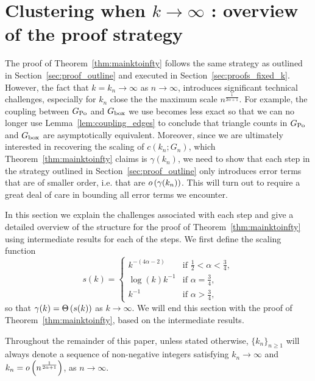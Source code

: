 
\section{Clustering when \texorpdfstring{$k\to\infty$}{k tends to infinity} : overview of the proof strategy}

The proof of Theorem~\ref{thm:mainktoinfty} follows the same strategy as outlined in Section~\ref{sec:proof_outline} and executed in Section~\ref{sec:proofs_fixed_k}. However, the fact that $k = k_n \to \infty$ as $n \to \infty$, introduces significant technical challenges, especially for $k_n$ close the the maximum scale $n^{\frac{1}{2\alpha + 1}}$. For example, the coupling between $G_{{\mathrm{Po}}}$ and $G_{\mathrm{box}}$ we use becomes less exact so that we can no longer use Lemma~\ref{lem:coupling_edges} to conclude that triangle counts in $G_{{\mathrm{Po}}}$ and $G_{\mathrm{box}}$ are asymptotically equivalent. Moreover, since we are ultimately interested in recovering the scaling of $c(k_n;G_n)$, which Theorem~\ref{thm:mainktoinfty} claims is $\gamma(k_n)$, we need to show that each step in the strategy outlined in Section~\ref{sec:proof_outline} only introduces error terms that are of smaller order, i.e. that are $o\left(\gamma(k_n)\right)$. This will turn out to require a great deal of care in bounding all error terms we encounter.

In this section we explain the challenges associated with each step and give a detailed overview of the structure for the proof of Theorem~\ref{thm:mainktoinfty} using intermediate results for each of the steps. We first define the scaling function
\begin{equation}\label{eq:def_scaling_function}
	s(k) = \begin{cases}
		k^{-(4\alpha - 2)} &\mbox{if } \frac{1}{2} < \alpha < \frac{3}{4},\\
		\log(k) k^{-1} &\mbox{if } \alpha = \frac{3}{4},\\
		k^{-1} &\mbox{if } \alpha > \frac{3}{4},
	\end{cases}
\end{equation}
so that $\gamma(k) = \Theta\left(s(k)\right)$ as $k \to \infty$. We will end this section with the proof of Theorem~\ref{thm:mainktoinfty}, based on the intermediate results.

\begin{remark}[Diverging $k_n$]
Throughout the remainder of this paper, unless stated otherwise, $\{k_n\}_{n \ge 1}$ will always denote a sequence of non-negative integers satisfying $k_n \to \infty$ and $k_n = o\left(n^{\frac{1}{2\alpha + 1}}\right)$, as $n \to \infty$.
\end{remark}

